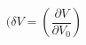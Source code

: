 \begin{equation}
\label{eq:deltaV}
(\delta V = \left( \frac{\partial{V}}{\partial{V_0}}\right)
\end{equation}